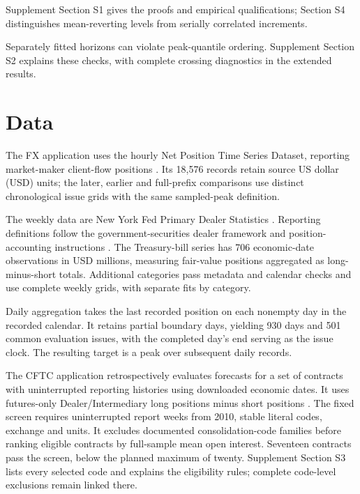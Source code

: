 \documentclass{rQUF2e}
\begin{document}
Supplement Section S1 gives the proofs and empirical qualifications; Section S4 distinguishes mean-reverting levels from serially correlated increments.


Separately fitted horizons can violate peak-quantile ordering. Supplement Section S2 explains these checks, with complete crossing diagnostics in the extended results.


\FloatBarrier

\section{Data}\label{sec:data}

The FX application uses the hourly Net Position Time Series Dataset, reporting market-maker client-flow positions \citep{dataset,wisniewski2020}. Its 18,576 records retain source US dollar (USD) units; the later, earlier and full-prefix comparisons use distinct chronological issue grids with the same sampled-peak definition.

The weekly data are New York Fed Primary Dealer Statistics \citep{nyfeddata}. Reporting definitions follow the government-securities dealer framework and position-accounting instructions \citep{fr2004_2013,fr2004_2024}. The Treasury-bill series has 706 economic-date observations in USD millions, measuring fair-value positions aggregated as long-minus-short totals. Additional categories pass metadata and calendar checks and use complete weekly grids, with separate fits by category.

Daily aggregation takes the last recorded position on each nonempty day in the recorded calendar. It retains partial boundary days, yielding 930 days and 501 common evaluation issues, with the completed day's end serving as the issue clock. The resulting target is a peak over subsequent daily records.

The CFTC application retrospectively evaluates forecasts for a set of contracts with uninterrupted reporting histories using downloaded economic dates. It uses futures-only Dealer/Intermediary long positions minus short positions \citep{cftcTFF}. The fixed screen requires uninterrupted report weeks from 2010, stable literal codes, exchange and units. It excludes documented consolidation-code families before ranking eligible contracts by full-sample mean open interest. Seventeen contracts pass the screen, below the planned maximum of twenty. Supplement Section S3 lists every selected code and explains the eligibility rules; complete code-level exclusions remain linked there.
\end{document}
